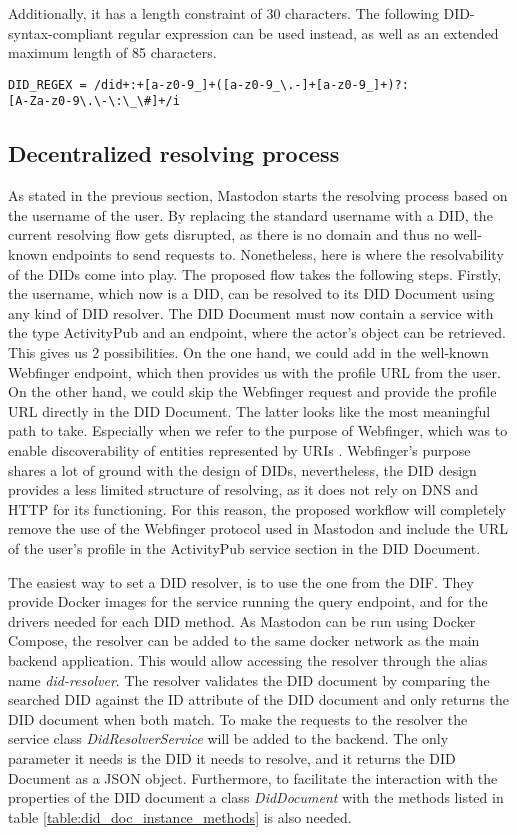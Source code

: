 Additionally, it has a length constraint of 30 characters. The following DID-syntax-compliant regular expression can be used instead, as well as an extended maximum length of 85 characters. 

\verb|DID_REGEX = /did+:+[a-z0-9_]+([a-z0-9_\.-]+[a-z0-9_]+)?:|\\\verb|[A-Za-z0-9\.\-\:\_\#]+/i |


\subsection{Decentralized resolving process}
As stated in the previous section, Mastodon starts the resolving process based on the username of the user. By replacing the standard username with a DID, the current resolving flow gets disrupted, as there is no domain and thus no well-known endpoints to send requests to. Nonetheless, here is where the resolvability of the DIDs come into play. The proposed flow takes the following steps. Firstly, the username, which now is a DID, can be resolved to its DID Document using any kind of DID resolver. The DID Document must now contain a service with the type ActivityPub and an endpoint, where the actor's object can be retrieved. This gives us 2 possibilities. On the one hand, we could add in the well-known Webfinger endpoint, which then provides us with the profile URL from the user. On the other hand, we could skip the Webfinger request and provide the profile URL directly in the DID Document. The latter looks like the most meaningful path to take. Especially when we refer to the purpose of Webfinger, which was to enable discoverability of entities represented by URIs \cite{jones_salgueiro_jones_smarr_2013}. Webfinger's purpose shares a lot of ground with the design of DIDs, nevertheless, the DID design provides a less limited structure of resolving, as it does not rely on DNS and HTTP for its functioning. For this reason, the proposed workflow will completely remove the use of the  Webfinger protocol used in Mastodon and include the URL of the user's profile in the ActivityPub service section in the DID Document.

The easiest way to set a DID resolver, is to use the one from the DIF. They provide Docker images for the service running the query endpoint, and for the drivers needed for each DID method. As Mastodon can be run using Docker Compose, the resolver can be added to the same docker network as the main backend application. This would allow accessing the resolver through the alias name \emph{did-resolver}. The resolver validates the DID document by comparing the searched DID against the ID attribute of the DID document and only returns the DID document when both match. To make the requests to the resolver the service class \emph{DidResolverService} will be added to the backend. The only parameter it needs is the DID it needs to resolve, and it returns the DID Document as a JSON object. Furthermore, to facilitate the interaction with the properties of the DID document a class \emph{DidDocument} with the methods listed in table \ref{table:did_doc_instance_methods} is also needed.

